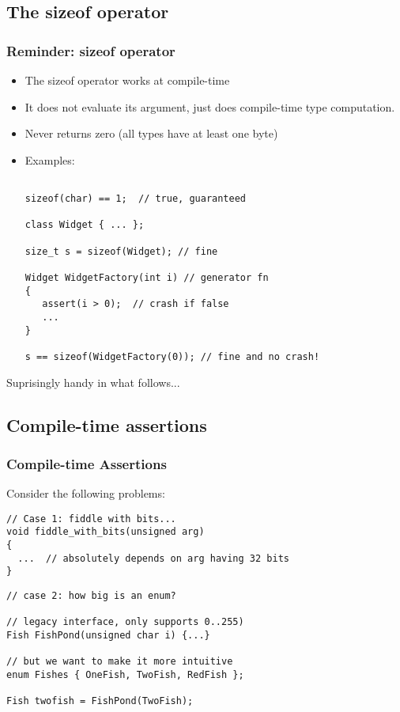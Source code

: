\subsection{The sizeof operator}

\begin{frame}[fragile,t]
\frametitle{Reminder: sizeof operator}

\begin{itemize}[<+->]
\item The sizeof operator works at compile-time
\item It does not evaluate its argument, just does compile-time type
  computation.
\item Never returns zero (all types have at least one byte)
\item Examples:
{\scriptsize\begin{verbatim}

sizeof(char) == 1;  // true, guaranteed

class Widget { ... };

size_t s = sizeof(Widget); // fine

Widget WidgetFactory(int i) // generator fn
{
   assert(i > 0);  // crash if false
   ...
}

s == sizeof(WidgetFactory(0)); // fine and no crash!
\end{verbatim}
}
\end{itemize}
\pause
Suprisingly handy in what follows...
\end{frame}


\subsection{Compile-time assertions}

\begin{frame}[fragile,t]
\frametitle{Compile-time Assertions}
Consider the following problems:
{\scriptsize\begin{verbatim}
// Case 1: fiddle with bits...
void fiddle_with_bits(unsigned arg)
{
  ...  // absolutely depends on arg having 32 bits
}
\end{verbatim}
}
\pause
{\scriptsize\begin{verbatim}
// case 2: how big is an enum?

// legacy interface, only supports 0..255)
Fish FishPond(unsigned char i) {...} 

// but we want to make it more intuitive
enum Fishes { OneFish, TwoFish, RedFish };

Fish twofish = FishPond(TwoFish);
\end{verbatim}
}

\end{frame}

